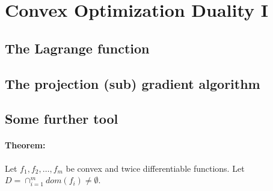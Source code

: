 \documentclass[main]{subfiles}
\begin{document}

\section{Convex Optimization Duality I}

\subsection{The Lagrange function}

\subsection{The projection (sub) gradient algorithm}
\subsection{Some further tool}
\paragraph{Theorem:}
Let $f_{1}, f_{2}, \dots, f_{m}$ be convex and twice differentiable functions. Let $D = \cap_{i = 1}^{m} dom (f_{i}) \neq \emptyset$.
\end{document}
